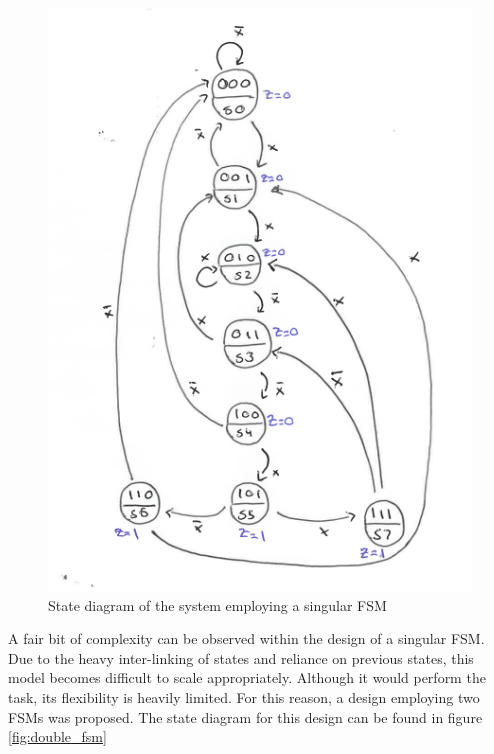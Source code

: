 \documentclass[12pt,a4paper]{article}
\begin{document}
\begin{figure}[H]
    \centering
    \includegraphics[scale=1]{images/single_fsm.png}
    \caption{State diagram of the system employing a singular FSM}
    \label{fig:single_fsm}
\end{figure}

A fair bit of complexity can be observed within the design of a singular FSM. Due to the heavy inter-linking of states and reliance on previous states, this model becomes difficult to scale appropriately. Although it would perform the task, its flexibility is heavily limited. For this reason, a design employing two FSMs was proposed. The state diagram for this design can be found in figure \ref{fig:double_fsm}
\end{document}
